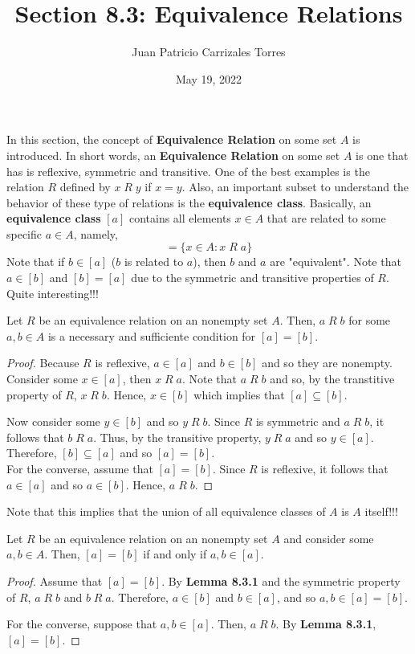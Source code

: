 \documentclass[12pt]{article}
\newenvironment{lemma}[2][Lemma]{\begin{trivlist}
		\item[\hskip \labelsep {\bfseries #1}\hskip \labelsep {\bfseries #2.}]}{\end{trivlist}}
\newenvironment{corollary}[2][Corollary]{\begin{trivlist}
		\item[\hskip \labelsep {\bfseries #1}\hskip \labelsep {\bfseries #2.}]}{\end{trivlist}}
\begin{document}
 
	
	\title{Section 8.3: Equivalence Relations}
	\author{Juan Patricio Carrizales Torres}
	\date{May 19, 2022}
	\maketitle
	
	In this section, the concept of \textbf{Equivalence Relation} on some set $A$ is introduced. In short words, an \textbf{Equivalence Relation} on some set $A$ is one that has is reflexive, symmetric and transitive. One of the best examples is the relation $R$ defined by $x\; R \; y$ if $x=y$. Also, an important subset to understand the behavior of these type of relations is the \textbf{equivalence class}. Basically, an \textbf{equivalence class} $[a]$ contains all elements $x\in A$ that are related to some specific $a\in A$, namely, 
	\begin{equation*}
		[a] = \{x\in A: x\; R \;a\}
	\end{equation*}
	Note that if $b\in [a]$ ($b$ is related to $a$), then $b$ and $a$ are "equivalent". Note that $a\in[b]$ and $[b]=[a]$ due to the symmetric and transitive properties of $R$. Quite interesting!!!  
	
	\begin{lemma}{8.3.1}
		Let $R$ be an equivalence relation on an nonempty set $A$. Then, $a\; R \; b$ for some $a,b\in A$ is a necessary and sufficiente condition for $[a]=[b]$.
		\begin{proof}
			Because $R$ is reflexive, $a\in [a]$ and $b\in [b]$ and so they are nonempty. Consider some $x\in [a]$, then $x\; R \; a$. Note that $a\; R \; b$ and so, by the transtitive property of $R$, $x\; R \; b$. Hence, $x\in [b]$ which implies that $[a]\subseteq [b]$.
			
			Now consider some $y\in [b]$ and so $y\; R\; b$. Since $R$ is symmetric and $a\; R \; b$, it follows that $b\; R \;a$. Thus, by the transitive property, $y\; R\; a$ and so $y\in [a]$. Therefore, $[b]\subseteq [a]$ and so $[a]=[b]$.\\
			
			For the converse, assume that $[a]=[b]$. Since $R$ is reflexive, it follows that $a\in [a]$ and so $a\in [b]$. Hence, $a\; R \; b$.
		\end{proof}
	\end{lemma}
		Note that this implies that the union of all equivalence classes of $A$ is $A$ itself!!!
		
	\begin{corollary}{8.3.1}
		Let $R$ be an equivalence relation on an nonempty set $A$ and consider some $a,b\in A$. Then, $[a] = [b]$ if and only if $a,b\in [a]$.
		\begin{proof}
			Assume that $[a]=[b]$. By \textbf{Lemma 8.3.1} and the symmetric property of $R$, $a\; R\; b$ and $b\; R\; a$. Therefore, $a\in [b]$ and $b\in [a]$, and so $a,b\in [a]=[b]$.
			
			For the converse, suppose that $a,b \in [a]$. Then, $a\; R\; b$. By \textbf{Lemma 8.3.1}, $[a]=[b]$.
		\end{proof}
	\end{corollary}
		
\end{document}
